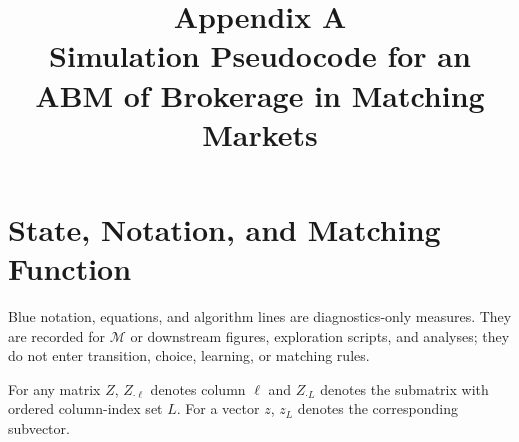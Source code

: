 \documentclass[11pt]{article}
\title{Appendix A\\Simulation Pseudocode for an ABM of Brokerage in Matching Markets}
\author{}
\date{}
\newcommand{\diag}[1]{\textcolor{diagblue}{#1}}
\begin{document}
\maketitle

\section{State, Notation, and Matching Function}

\diag{Blue notation, equations, and algorithm lines are diagnostics-only
measures. They are recorded for $\mathcal M$ or downstream figures,
exploration scripts, and analyses; they do not enter transition, choice,
learning, or matching rules.}

For any matrix $Z$, $Z_{\cdot\ell}$ denotes column $\ell$ and
$Z_{\cdot L}$ denotes the submatrix with ordered column-index set $L$.
For a vector $z$, $z_L$ denotes the corresponding subvector.
\end{document}
